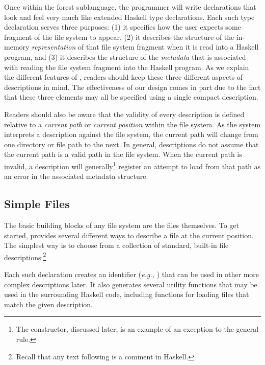 \documentclass[nocopyrightspace,natbib]{sigplanconf}
\begin{document}
Once within the forest sublanguage, the programmer will write declarations
that look and feel very much like extended Haskell type declarations.
Each such type declaration serves three purposes: (1) it specifies how the user
expects some fragment of the file system to appear, (2) it describes
the structure of the in-memory {\em representation} of that 
file system fragment when it is read into a Haskell program, and (3) it describes 
the structure of the {\em metadata} that is associated with reading the file system
fragment into the Haskell program.  As we explain the different features of \forest{}, 
readers should keep these three different aspects of \forest{} descriptions in mind.  
The effectiveness of our design comes in part due to the fact that these three 
elements may all be specified using a single compact description.  

Readers should also be aware
that the validity of every description is defined relative to a 
{\em current path} or {\em current position} within the file system.  As 
the system interprets a description against the file system, the current path
will change from one directory or file path to the next.  In general, descriptions
do not assume that the current path is a valid path in the file system.  When the current
path is invalid, a description will generally\footnote{The  constructor,
discussed later, is an example of an exception to the general rule.} 
register an attempt to load from that
path as an error in the associated metadata structure.

\subsection{Simple Files}
\label{sec:basics}

The basic building blocks of any file system are the files themselves.  To get started,
\forest{} provides several different ways to describe a file at the current position.  The simplest
way is to choose from a collection of standard, built-in file descriptions:\footnote{Recall that
any text following \cd{--} is a comment in Haskell.} 
\noindent
\begin{code}
[forest| 
  type MyText = File Ptext   -- a text file
  type MyBin = File Pbin     -- a binary file
  type Whatever = File Pany  -- any file at all
|]
\end{code}
Each such declaration creates an identifier ({\it e.g.,} ) that can be used in other
more complex descriptions later.  It also generates several utility functions that may
be used in the surrounding Haskell code, including functions 
for loading files that match the given description.  
\end{document}
